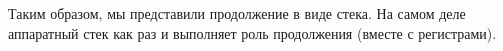 Таким образом, мы представили продолжение в виде стека.
На самом деле аппаратный стек как раз и выполняет роль продолжения (вместе с регистрами).










